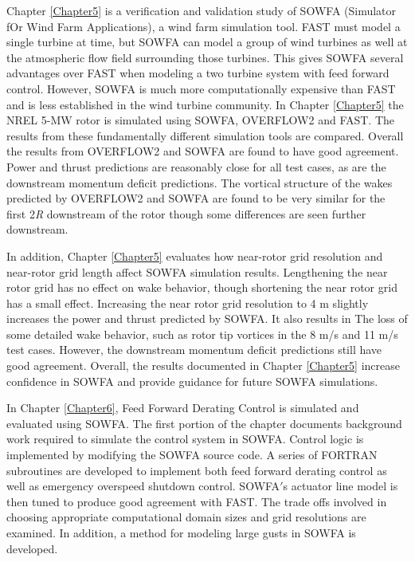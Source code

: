 Chapter \ref{Chapter5} is a verification and validation study of SOWFA (Simulator fOr Wind Farm Applications), a wind farm simulation tool. FAST must model a single turbine at time, but SOWFA can model a group of wind turbines as well at the atmospheric flow field surrounding those turbines. This gives SOWFA several advantages over FAST when modeling a two turbine system with feed forward control. However, SOWFA is much more computationally expensive than FAST and is less established in the wind turbine community. In Chapter \ref{Chapter5} the NREL 5-MW rotor is simulated using SOWFA, OVERFLOW2 and FAST. The results from these fundamentally different simulation tools are compared. Overall the results from OVERFLOW2 and SOWFA are found to have good agreement.  Power and thrust predictions are reasonably close for all test cases, as are the downstream momentum deficit predictions. The vortical structure of the wakes predicted by OVERFLOW2 and SOWFA are found to be very similar for the first 2\emph{R} downstream of the rotor though some differences are seen further downstream.

In addition, Chapter \ref{Chapter5} evaluates how near-rotor grid resolution and near-rotor grid length affect SOWFA simulation results. Lengthening the near rotor grid has no effect on wake behavior, though shortening the near rotor grid has a small effect. Increasing the near rotor grid resolution to 4 m slightly increases the power and thrust predicted by SOWFA. It also results in The loss of some detailed wake behavior, such as rotor tip vortices in the 8 m/s and 11 m/s test cases. However, the downstream momentum deficit predictions still have good agreement. Overall, the results documented in Chapter \ref{Chapter5} increase confidence in SOWFA and provide guidance for future SOWFA simulations.

In Chapter \ref{Chapter6}, Feed Forward Derating Control is simulated and evaluated using SOWFA. The first portion of the chapter documents background work required to simulate the control system in SOWFA. Control logic is implemented by modifying the SOWFA source code. A series of FORTRAN subroutines are developed to implement both feed forward derating control as well as emergency overspeed shutdown control. SOWFA$'$s actuator line model is then tuned to produce good agreement with FAST. The trade offs involved in choosing appropriate computational domain sizes and grid resolutions are examined. In addition, a method for modeling large gusts in SOWFA is developed.

